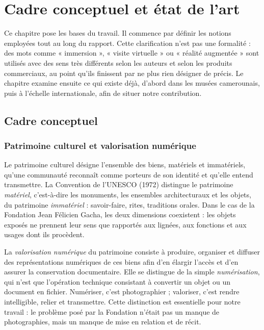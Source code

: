 \chapter{Cadre conceptuel et état de l'art}
\label{chap:cadre}

\introchap

Ce chapitre pose les bases du travail. Il commence par définir les notions
employées tout au long du rapport. Cette clarification n'est pas une formalité :
des mots comme « immersion », « visite virtuelle » ou « réalité augmentée » sont
utilisés avec des sens très différents selon les auteurs et selon les produits
commerciaux, au point qu'ils finissent par ne plus rien désigner de précis. Le
chapitre examine ensuite ce qui existe déjà, d'abord dans les musées
camerounais, puis à l'échelle internationale, afin de situer notre contribution.

\section{Cadre conceptuel}
\label{sec:conceptuel}

\subsection{Patrimoine culturel et valorisation numérique}

Le patrimoine culturel désigne l'ensemble des biens, matériels et immatériels,
qu'une communauté reconnaît comme porteurs de son identité et qu'elle entend
transmettre. La Convention de l'UNESCO (1972) distingue le patrimoine
\emph{matériel}, c'est-à-dire les monuments, les ensembles architecturaux et les
objets, du patrimoine \emph{immatériel} : savoir-faire, rites, traditions
orales. Dans le cas de la Fondation Jean Félicien Gacha, les deux dimensions
coexistent : les objets exposés ne prennent leur sens que rapportés aux lignées,
aux fonctions et aux usages dont ils procèdent.

La \emph{valorisation numérique} du patrimoine consiste à produire, organiser et
diffuser des représentations numériques de ces biens afin d'en élargir l'accès
et d'en assurer la conservation documentaire. Elle se distingue de la simple
\emph{numérisation}, qui n'est que l'opération technique consistant à convertir
un objet ou un document en fichier. Numériser, c'est photographier ; valoriser,
c'est rendre intelligible, relier et transmettre. Cette distinction est
essentielle pour notre travail : le problème posé par la Fondation n'était pas
un manque de photographies, mais un manque de mise en relation et de récit.

